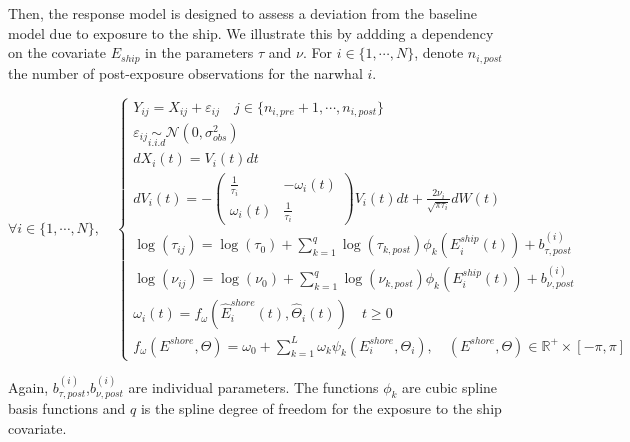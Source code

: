 \documentclass[11pt]{article}
\newcommand {\R}{\mathbb{R}}
\newcommand {\1}{\mathbb{1}}
\begin{document}
Then, the response model is designed to assess a deviation from the baseline model due to exposure to the ship. We illustrate this by addding a dependency on the covariate $E_{ship}$ in the parameters $\tau$ and $\nu$. 
For $i \in \{1, \cdots, N\}$, denote $n_{i,post}$ the number of post-exposure observations for the narwhal $i$.

\begin{equation}  \forall i \in \{1,\cdots,N\}, \quad \left\{
	\begin{array}{l}
		Y_{ij}=X_{ij}+\varepsilon_{ij} \quad j \in \{n_{i,pre}+1,\cdots,n_{i,post}\}\\
		\varepsilon_{ij} \underset{i.i.d}{\sim} \mathcal{N}(0,\sigma_{obs}^2)  \\
		dX_i(t)=V_i(t)dt  \\
		dV_i(t)=-\begin{pmatrix} 
			\frac{1}{\tau_i} & -\omega_i(t) \\
			\omega_i(t) & \frac{1}{\tau_i}
		\end{pmatrix}V_i(t)dt+\frac{2\nu_i}{\sqrt{\pi \tau_i}} dW(t) \\
		\log(\tau_{ij})=\log(\tau_{0}) +\sum_{k=1}^{q} \log(\tau_{k,post})\phi_{k}(E^{ship}_i(t))+b^{(i)}_{\tau,post} \\
		\log(\nu_{ij})=\log(\nu_{0}) +  \sum_{k=1}^{q} \log(\nu_{k,post}) \phi_{k}(E^{ship}_i(t)) +b^{(i)}_{\nu,post}  \\
		\omega_i(t)=f_{\omega}(\hat{E}^{shore}_i(t),\hat{\Theta}_i(t)) \quad t \geq 0\\
		f_{\omega}(E^{shore},\Theta)=\omega_{0}+\sum_{k=1}^{L} \omega_{k} \psi_k(E^{shore}_i,\Theta_i), \quad (E^{shore},\Theta) \in \R^+ \times [-\pi,\pi]
	\end{array}
	\right.
	\label{eq: exact response model}
\end{equation}


Again, $b^{(i)}_{\tau,post}$,$b^{(i)}_{\nu,post}$ are individual parameters. The functions $\phi_k$ are cubic spline basis functions and $q$ is the spline degree of freedom for the exposure to the ship covariate.
\end{document}
